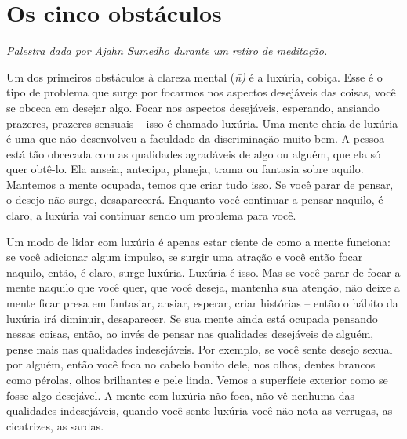 
\chapter{Os cinco obstáculos}

{\itshape
Palestra dada por Ajahn Sumedho durante um retiro de meditação.}

Um dos primeiros obstáculos à clareza mental (\textit{n\=\ivaranas)
}é a luxúria, cobiça. Esse é o tipo de problema que surge por focarmos
nos aspectos desejáveis das coisas, você se obceca em desejar algo.
Focar nos aspectos desejáveis, esperando, ansiando prazeres, prazeres
sensuais – isso é chamado luxúria. Uma mente cheia de luxúria é uma que
não desenvolveu a faculdade da discriminação muito bem. A pessoa está
tão obcecada com as qualidades agradáveis de algo ou alguém, que ela só
quer obtê-lo. Ela anseia, antecipa, planeja, trama ou fantasia sobre
aquilo. Mantemos a mente ocupada, temos que criar tudo isso. Se você
parar de pensar, o desejo não surge, desaparecerá. Enquanto você
continuar a pensar naquilo, é claro, a luxúria vai continuar sendo um
problema para você. 

Um modo de lidar com luxúria é apenas estar ciente de como a mente
funciona: se você adicionar algum impulso, se surgir uma atração e você
então focar naquilo, então, é claro, surge luxúria. Luxúria é isso. Mas
se você parar de focar a mente naquilo que você quer, que você deseja,
mantenha sua atenção, não deixe a mente ficar presa em fantasiar,
ansiar, esperar, criar histórias – então o hábito da luxúria irá
diminuir, desaparecer. Se sua mente ainda está ocupada pensando nessas
coisas, então, ao invés de pensar nas qualidades desejáveis de alguém,
pense mais nas qualidades indesejáveis. Por exemplo, se você sente
desejo sexual por alguém, então você foca no cabelo bonito dele, nos
olhos, dentes brancos como pérolas, olhos brilhantes e pele linda.
Vemos a superfície exterior como se fosse algo desejável. A mente com
luxúria não foca, não vê nenhuma das qualidades indesejáveis, quando
você sente luxúria você não nota as verrugas, as cicatrizes, as sardas.


